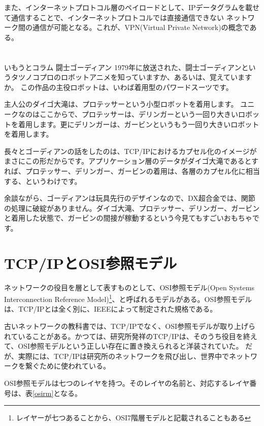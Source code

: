 また、インターネットプロトコル層のペイロードとして、IPデータグラムを載せて通信することで、インターネットプロトコルでは直接通信できない
ネットワーク間の通信が可能となる。これが、VPN(Virtual Private Network)の概念である。
\section*{}
\begin{itembox}[l]{いもうとコラム 闘士ゴーディアン}
1979年に放送された、闘士ゴーディアンというタツノコプロのロボットアニメを知っていますか、あるいは、覚えていますか。
この作品の主役ロボットは、いわば着用型のパワードスーツです。

主人公のダイゴ大滝は、プロテッサーという小型ロボットを着用します。
ユニークなのはここからで、プロテッサーは、デリンガーという一回り大きいロボットを着用します。更にデリンガーは、ガービンというもう一回り大きいロボットを着用します。

長々とゴーディアンの話をしたのは、TCP/IPにおけるカプセル化のイメージがまさにこの形だからです。アプリケーション層のデータがダイゴ大滝であるとすれば、プロテッサー、デリンガー、ガービンの着用は、各層のカプセル化に相当する、というわけです。

余談ながら、ゴーディアンは玩具先行のデザインなので、DX超合金では、関節の処理に破綻がありません。ダイゴ大滝、プロテッサー、デリンガー、ガービンと着用した状態で、ガービンの間接が稼動するという今見てもすごいおもちゃです。


\end{itembox}


\section{TCP/IPとOSI参照モデル}
ネットワークの役目を層として表すものとして、OSI参照モデル(Open Systems Interconnection Reference Model)\footnote{レイヤーが七つあることから、OSI7階層モデルと記載されることもある}、と呼ばれるモデルがある。OSI参照モデルは、TCP/IPとは全く別に、IEEEによって制定された規格である。

古いネットワークの教科書では、TCP/IPでなく、OSI参照モデルが取り上げられていることがある。かつては、研究所発祥のTCP/IPは、そのうち役目を終えて、OSI参照モデルという正しい存在に置き換えられると洋装されていた。
だが、実際には、TCP/IPは研究所のネットワークを飛び出し、世界中でネットワークを繋ぐために使われている。

OSI参照モデルは七つのレイヤを持つ。そのレイヤの名前と、対応するレイヤ番号は、表\ref{osirm}となる。

